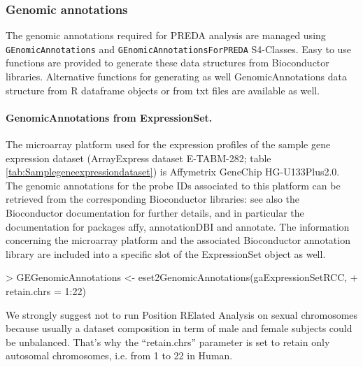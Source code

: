 \documentclass[a4paper,10pt]{article}
\begin{document}




\subsubsection{Genomic annotations}
The genomic annotations required for PREDA analysis are managed using \texttt{GEnomicAnnotations} and \texttt{GEnomicAnnotationsForPREDA} S4-Classes. Easy to use functions are provided to generate these data structures from Bioconductor libraries. Alternative functions for generating as well GenomicAnnotations data structure from R dataframe objects or from txt files are available as well.

\paragraph{GenomicAnnotations from ExpressionSet.} The microarray platform used for the expression profiles of the sample gene expression dataset (ArrayExpress dataset E-TABM-282; table \ref{tab:Samplegeneexpressiondataset}) is Affymetrix GeneChip HG-U133Plus2.0. The genomic annotations for the probe IDs associated to this platform can be retrieved from the corresponding Bioconductor libraries: see also the Bioconductor documentation for further details, and in particular the documentation for packages affy, annotationDBI and annotate. The information concerning the microarray platform and the associated Bioconductor annotation library are included into a specific slot of the ExpressionSet object as well.

\begin{Schunk}
\begin{Sinput}
> GEGenomicAnnotations <- eset2GenomicAnnotations(gaExpressionSetRCC, 
+     retain.chrs = 1:22)
\end{Sinput}
\end{Schunk}

We strongly suggest not to run Position RElated Analysis on sexual chromosomes because usually a dataset composition in term of male and female subjects could be unbalanced. That's why the ``retain.chrs'' parameter is set to retain only autosomal chromosomes, i.e. from 1 to 22 in Human.


\end{document}
